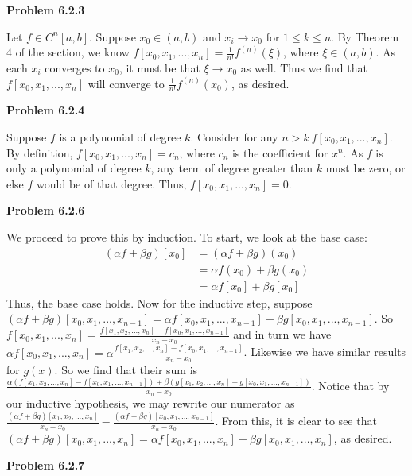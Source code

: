 \documentclass{article}
\newcommand{\Problem}[1]{\textbf{Problem #1}}
\begin{document}
\Problem{6.2.3}

Let $f \in C^n[a,b]$. Suppose $x_0 \in (a,b)$ and $x_i \to x_0$ for $1 \leq k \leq n$. By Theorem 4 of the section, we know $f[x_0,x_1,...,x_n] = \frac{1}{n!}f^{(n)}(\xi)$, where $\xi \in (a,b)$. As each $x_i$ converges to $x_0$, it must be that $\xi \to x_0$ as well. Thus we find that $f[x_0,x_1,...,x_n]$ will converge to $\frac{1}{n!}f^{(n)}(x_0)$, as desired.

\Problem{6.2.4}

Suppose $f$ is a polynomial of degree $k$. Consider for any $n > k\ f[x_0,x_1,...,x_n]$. By definition, $f[x_0,x_1,...,x_n] = c_n$, where $c_n$ is the coefficient for $x^n$. As $f$ is only a polynomial of degree $k$, any term of degree greater than $k$ must be zero, or else $f$ would be of that degree. Thus, $f[x_0,x_1,...,x_n] = 0$. 

\Problem{6.2.6}

We proceed to prove this by induction. To start, we look at the base case:
\begin{align*}
(\alpha f + \beta g)[x_0] &= (\alpha f + \beta g)(x_0)\\
&= \alpha f(x_0) + \beta g(x_0)\\
&= \alpha f[x_0] + \beta g[x_0]
\end{align*}
Thus, the base case holds. Now for the inductive step, suppose $(\alpha f + \beta g)[x_0,x_1,...,x_{n-1}] = \alpha f[x_0,x_1,...,x_{n-1}] + \beta g[x_0,x_1,...,x_{n-1}]$. So $f[x_0,x_1,...,x_n] = \displaystyle\frac{f[x_1,x_2,...,x_n] - f[x_0,x_1,...,x_{n-1}]}{x_n - x_0}$ and in turn we have $\alpha f[x_0,x_1,...,x_n] = \alpha\displaystyle\frac{f[x_1,x_2,...,x_n] - f[x_0,x_1,...,x_{n-1}]}{x_n - x_0}$. Likewise we have similar results for $g(x)$. So we find that their sum is $\displaystyle\frac{\alpha (f[x_1,x_2,...,x_n] - f[x_0,x_1,...,x_{n-1}]) + \beta(g[x_1,x_2,...,x_n] - g[x_0,x_1,...,x_{n-1}])}{x_n-x_0}$. Notice that by our inductive hypothesis, we may rewrite our numerator as $\displaystyle\frac{(\alpha f + \beta g)[x_1,x_2,...,x_n]}{x_n-x_0} - \displaystyle\frac{(\alpha f + \beta g)[x_0,x_1,...,x_{n-1}]}{x_n-x_0}$. From this, it is clear to see that $(\alpha f + \beta g)[x_0,x_1,...,x_n] = \alpha f[x_0,x_1,...,x_n] + \beta g[x_0,x_1,...,x_n]$, as desired. 

\Problem{6.2.7}
\end{document}
